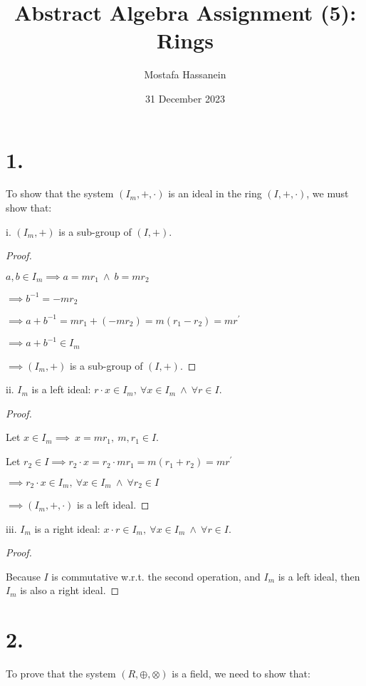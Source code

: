 \documentclass{article}
\author{Mostafa Hassanein}
\title{Abstract Algebra Assignment (5): Rings}
\date{31 December 2023}
\begin{document}
\maketitle

\newpage

\section*{1.}
To show that the system $(I_m,+, \cdot)$ is an ideal in the ring $(I,+,\cdot)$, we must show that:

\noindent
i. $(I_m,+)$ is a sub-group of $(I, +)$.

\begin{proof}
  $ $

  $a,b \in I_m \implies a = mr_1 \ \land \ b = mr_2$

  $\implies b^{-1} = -mr_2$
  
  $\implies a+b^{-1} = mr_1 + (-mr_2) = m(r_1-r_2) = mr^{\prime}$

  $\implies a+b^{-1} \in I_m$

  $\implies (I_m,+)$ is a sub-group of $(I, +)$.

\end{proof}

\noindent
ii. $I_m$ is a left ideal: $r \cdot x \in I_m, \ \forall x \in I_m \ \land \ \forall r \in I$.

\begin{proof}
  $ $

  Let $x \in I_m \implies \ x=mr_1, \ m,r_1 \in I$.

  Let $r_2 \in I \implies r_2 \cdot x = r_2 \cdot mr_1 = m(r_1 + r_2) = mr^{\prime}$

  $\implies r_2 \cdot x \in I_m, \ \forall x \in I_m \ \land \ \forall r_2 \in I$

  $\implies (I_m, +, \cdot)$ is a left ideal.

  
\end{proof}

\noindent
iii. $I_m$ is a right ideal: $x \cdot r \in I_m, \ \forall x \in I_m \ \land \ \forall r \in I$.

\begin{proof}
  $ $

  Because $I$ is commutative w.r.t. the second operation, and $I_m$ is a left ideal, then $I_m$ is also a right ideal.

\end{proof}

\section*{2.}
To prove that the system $(R, \oplus, \otimes)$ is a field, we need to show that:
\end{document}
